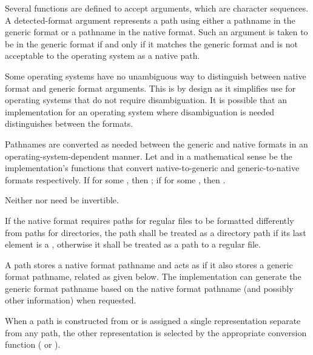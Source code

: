 \pnum
Several functions are defined to accept  arguments,
which are character sequences. A detected-format argument represents a path
using either a pathname in the generic format
or a pathname in the native format.
Such an argument is taken to be in the generic format if and only if
it matches the generic format and is not acceptable to the operating system
as a native path.

\pnum
\begin{note}
Some operating systems have no unambiguous way to distinguish between native format and generic format arguments.
This is by design as it simplifies use for operating systems that do not require
disambiguation. It is possible that an implementation for an operating system
where disambiguation is needed distinguishes between the formats.
\end{note}

\pnum
Pathnames are converted as needed between the generic and native formats
in an operating-system-dependent manner.
Let  and  in a mathematical sense
be the implementation's functions that convert native-to-generic
and generic-to-native formats respectively.
If  for some , then ;
if  for some , then .
\begin{note}
Neither  nor  need be invertible.
\end{note}

\pnum
If the native format requires paths for regular files to be formatted
differently from paths for directories, the path shall be treated as a directory
path if its last element is a ,
otherwise it shall be treated as a path to a regular file.

\pnum
\begin{note}
A path stores a native format pathname
and acts as if it also stores a generic format pathname,
related as given below.
The implementation can generate the generic format pathname
based on the native format pathname (and possibly other information)
when requested.
\end{note}

\pnum
When a path is constructed from or is assigned a single representation
separate from any path, the other representation is selected
by the appropriate conversion function ( or ).


